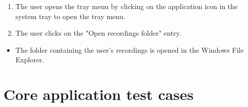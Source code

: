 \begin{tests}
    {\begin{enumerate}
        \item The \gls{user} opens the tray menu by clicking on the application icon in the system tray to open the tray menu.
        \item The \gls{user} clicks on the "Open recordings folder" entry.
    \end{enumerate}}
    {\begin{itemize}
        \item The folder containing the \gls{user}'s recordings is opened in the Windows File Explorer.
    \end{itemize}}
\end{tests}

\section{Core application test cases}
\setcounter{counterTC}{190}
